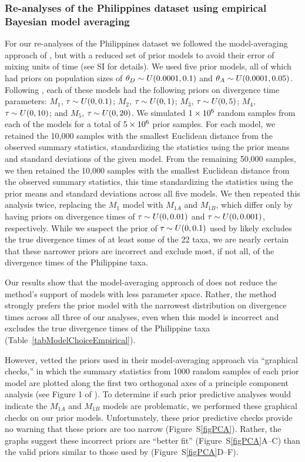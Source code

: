 \subsubsection{Re-analyses of the Philippines dataset using empirical Bayesian
model averaging}

For our re-analyses of the Philippines dataset we followed the model-averaging
approach of \citet{Hickerson2013}, but with a reduced set of prior models to
avoid their error of mixing units of time (see SI for details).
We used five prior models, all of which had priors on population sizes of
$\meanDescendantTheta{} \sim U(0.0001, 0.1)$ and $\ancestralTheta{} \sim
U(0.0001, 0.05)$.
Following \citet{Hickerson2013}, each of these models had the following
priors on divergence time parameters:
$M_1$, $\tau_{} \sim U(0, 0.1)$;
$M_2$, $\tau_{} \sim U(0, 1)$;
$M_3$, $\tau_{} \sim U(0, 5)$;
$M_4$, $\tau_{} \sim U(0, 10)$; and
$M_5$, $\tau_{} \sim U(0, 20)$.
We simulated $1\times 10^{6}$ random samples from each of the models for a total of
$5\times 10^{6}$ prior samples.
For each model, we retained the 10,000 samples with the smallest Euclidean
distance from the observed summary statistics, standardizing the statistics
using the prior means and standard deviations of the given model.
From the remaining 50,000 samples, we then retained the 10,000 samples with the
smallest Euclidean distance from the observed summary statistics, this time
standardizing the statistics using the prior means and standard deviations
across all five models.
We then repeated this analysis twice, replacing the $M_1$ model with
$M_{1A}$ and $M_{1B}$, which differ only by having priors on divergence
times of $\tau_{} \sim U(0, 0.01)$ and $\tau_{} \sim U(0, 0.001)$,
respectively.
While we suspect the prior of $\tau_{} \sim U(0, 0.1)$ used by
\citet{Hickerson2013} likely excludes the true divergence times of at least
some of the 22 taxa, we are nearly certain that these narrower priors are
incorrect and exclude most, if not all, of the divergence times of the
Philippine taxa.

Our results show that the model-averaging approach of \citet{Hickerson2013}
does not reduce the method's support of models with less parameter space.
Rather, the method strongly prefers the prior model with the narrowest
distribution on divergence times across all three of our analyses, even when
this model is incorrect and excludes the true divergence times
of the Philippine taxa (Table~\ref{tabModelChoiceEmpirical}).

However, \citet{Hickerson2013} vetted the priors used in their model-averaging
approach via ``graphical checks,'' in which the summary statistics from 1000
random samples of each prior model are plotted along the first two orthogonal
axes of a principle component analysis (see Figure 1 of \citet{Hickerson2013}).
To determine if such prior predictive analyses would indicate the $M_{1A}$ and
$M_{1B}$ models are problematic, we performed these graphical checks on our
prior models.
Unfortunately, these prior predictive checks provide no warning that these
priors are too narrow (Figure~S\ref{figPCA}).
Rather, the graphs suggest these incorrect priors are ``better fit''
(Figure~S\ref{figPCA}A--C) than the valid priors similar to those used by
\citet{Oaks2012} (Figure~S\ref{figPCA}D--F).

